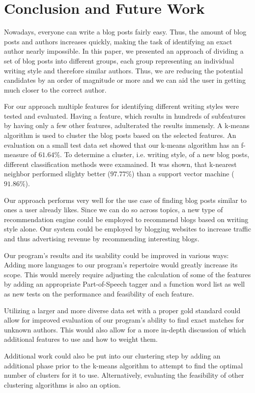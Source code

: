 \section{Conclusion and Future Work}
\label{sec:conclusion}

Nowadays, everyone can write a blog posts fairly easy.
Thus, the amount of blog posts and authors increases quickly, making the task of identifying an exact author nearly impossible.
In this paper, we presented an approach of dividing a set of blog posts into different groups, each group representing an individual writing style and therefore similar authors.
Thus, we are reducing the potential candidates by an order of magnitude or more and we can aid the user in getting much closer to the correct author.


For our approach multiple features for identifying different writing styles were tested and evaluated.
Having a feature, which results in hundreds of subfeatures by having only a few other features, adulterated the results immensly.
A k-means algorithm is used to cluster the blog posts based on the selected features.
An evaluation on a small test data set showed that our k-means algorithm has an f-measure of $61.64\%$.
To determine a cluster, i.e. writing style, of a new blog posts, different classification methods were examained.
It was shown, that k-nearest neighbor performed slighty better ($97.77\%$) than a support vector machine ($91.86\%$).


Our approach performs very well for the use case of finding blog posts similar to ones a user already likes.
Since we can do so across topics, a new type of recommendation engine could be employed to recommend blogs based on writing style alone.
Our system could be employed by blogging websites to increase traffic and thus advertising revenue by recommending interesting blogs.


Our program’s results and its usability could be improved in various ways: Adding more languages to our program’s repertoire would greatly increase its scope.
This would merely require adjusting the calculation of some of the features by adding an appropriate Part-of-Speech tagger and a function word list as well as new tests on the performance and feasibility of each feature.


Utilizing a larger and more diverse data set with a proper gold standard could allow for improved evaluation of our program’s ability to find exact matches for unknown authors.
This would also allow for a more in-depth discussion of which additional features to use and how to weight them.


Additional work could also be put into our clustering step by adding an additional phase prior to the k-means algorithm to attempt to find the optimal number of clusters for it to use.
Alternatively, evaluating the feasibility of other clustering algorithms is also an option.